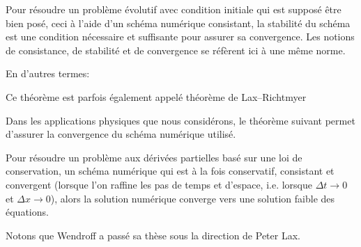 \begin{theoreme}
Pour résoudre un problème évolutif avec condition initiale qui est supposé être bien posé, ceci à l'aide d'un schéma numérique 
consistant, la stabilité du schéma est une condition nécessaire et suffisante pour assurer sa convergence.
Les notions de consistance, de stabilité et de convergence se réfèrent ici à une même norme.

En d'autres termes: 
\end{theoreme}
Ce théorème est parfois également appelé théorème de Lax–Richtmyer

\medskip
Dans les applications physiques que nous considérons, le théorème suivant permet d'assurer la convergence du
schéma numérique utilisé.
\begin{theoreme}
Pour résoudre un problème aux dérivées partielles basé sur une loi de conservation, un schéma numérique qui est à la fois conservatif, 
consistant et convergent (lorsque l'on raffine les pas de temps et d'espace, i.e. lorsque $\Delta t \rightarrow 0$ et $\Delta x \rightarrow 0$), 
alors la solution numérique converge vers une solution faible des équations.
\end{theoreme}

Notons que Wendroff a passé sa thèse sous la direction de Peter Lax.

